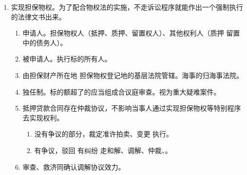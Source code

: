 \begin{enumerate}
\begin{enumerate}
\begin{enumerate}
                  \item 涉及适用其他特别程序。
                \end{enumerate}
          \item 肯定。确认调解协议效力 \yjt 给救济 \yjt 提异议。\yi 当事人 15 日。\er 利害人主观知道 6 个月。
          \item 否定。驳回 \yjt 走和解、调解、仲裁、（就调解协议）起诉。
        \end{enumerate}
  \item 实现担保物权。为了配合物权法的实施，不走诉讼程序就能作出一个强制执行的法律文书出来。
        \begin{enumerate}
          \item 申请人。担保物权人（抵押、质押、留置权人）、其他权利人（质押 \hz 留置中的债务人）。
          \item 被申请人。执行标的所有人。
          \item 由担保财产所在地 \hz 担保物权登记地的基层法院管辖。海事的归海事法院。
          \item 独任制。标的额超了的应当组成合议庭审查。视为重大疑难案件。
          \item 抵押贷款合同存在仲裁协议，不影响当事人通过实现担保物权等特别程序去实现权利。
                \begin{enumerate}
                  \item 没有争议的部分，裁定准许拍卖、变更 \yjt 执行。
                  \item 有争议，驳回 \yjt 有纠纷 \yjt 走和解、调解、仲裁、。
                \end{enumerate}
          \item 审查、救济同确认调解协议效力。
        \end{enumerate}
\end{enumerate}
